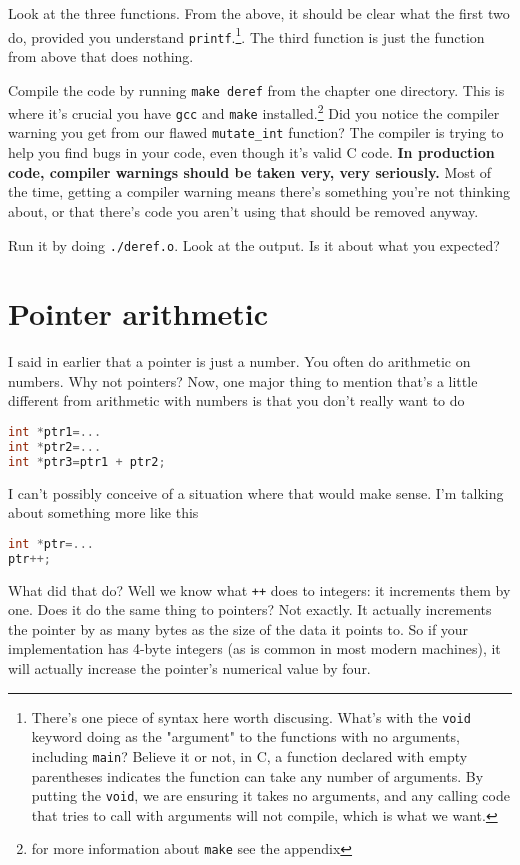 \documentclass[ebook,11pt,oneside,openany]{memoir}
\newcommand{\cf}[1]{\texttt{#1}}
\begin{document}
Look at the three functions. From the above, it should be clear what the first two do, provided you understand \texttt{printf}.\footnote{There's one piece of syntax here worth discusing. What's with the \texttt{void} keyword doing as the "argument" to the functions with no arguments, including \cf{main}? Believe it or not, in C, a function declared with empty parentheses indicates the function can take any number of arguments. By putting the \texttt{void}, we are ensuring it takes no arguments, and any calling code that tries to call with arguments will not compile, which is what we want.}. The third function is just the function from above that does nothing.

Compile the code by running \texttt{make deref} from the chapter one directory. This is where it's crucial you have \texttt{gcc} and \texttt{make} installed.\footnote{for more information about \texttt{make} see the appendix} Did you notice the compiler warning you get from our flawed \texttt{mutate\_int} function? The compiler is trying to help you find bugs in your code, even though it's valid C code. \textbf{In production code, compiler warnings should be taken very, very seriously.} Most of the time, getting a compiler warning means there's something you're not thinking about, or that there's code you aren't using that should be removed anyway.

Run it by doing \texttt{./deref.o}. Look at the output. Is it about what you expected?

\section{Pointer arithmetic}

I said in earlier that a pointer is just a number. You often do arithmetic on numbers. Why not pointers? Now, one major thing to mention that's a little different from arithmetic with numbers is that you don't really want to do 

\begin{lstlisting}[language=C]
int *ptr1=...
int *ptr2=...
int *ptr3=ptr1 + ptr2;
\end{lstlisting}

I can't possibly conceive of a situation where that would make sense. I'm talking about something more like this


\begin{lstlisting}[language=C]
int *ptr=...
ptr++;
\end{lstlisting}

What did that do? Well we know what \texttt{++} does to integers: it increments them by one. Does it do the same thing to pointers? Not exactly. It actually increments the pointer by as many bytes as the size of the data it points to. So if your implementation has 4-byte integers (as is common in most modern machines), it will actually increase the pointer's numerical value by four.
\end{document}
